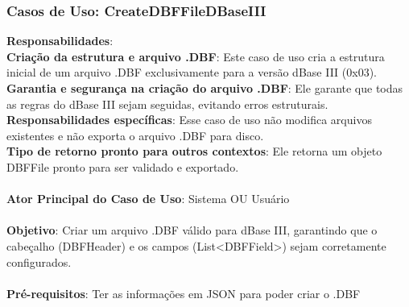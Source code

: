 \subsubsection{Casos de Uso: CreateDBFFileDBaseIII}

\textbf{Responsabilidades}: \\
\textbf{Criação da estrutura e arquivo .DBF}: Este caso de uso cria a estrutura inicial de um arquivo .DBF exclusivamente para a versão dBase III (0x03). \\
\textbf{Garantia e segurança na criação do arquivo .DBF}: Ele garante que todas as regras do dBase III sejam seguidas, evitando erros estruturais.\\
\textbf{Responsabilidades específicas}: Esse caso de uso não modifica arquivos existentes e não exporta o arquivo .DBF para disco.\\
\textbf{Tipo de retorno pronto para outros contextos}: Ele retorna um objeto DBFFile pronto para ser validado e exportado.\\\\

\textbf{Ator Principal do Caso de Uso}: Sistema OU Usuário\\\\
\textbf{Objetivo}: Criar um arquivo .DBF válido para dBase III, garantindo que o cabeçalho (DBFHeader) e os campos (List<DBFField>) sejam corretamente configurados.\\\\

\textbf{Pré-requisitos}: Ter as informações em JSON para poder criar o .DBF\\\\

